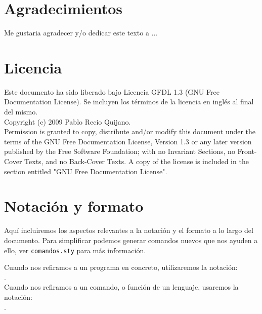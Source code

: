 

\section*{Agradecimientos}

Me gustaria agradecer y/o dedicar este texto a ...

\cleardoublepage

\section*{Licencia} %

Este documento ha sido liberado bajo Licencia GFDL 1.3 (GNU Free
Documentation License). Se incluyen los términos de la licencia en
inglés al final del mismo.\\

Copyright (c) 2009 Pablo Recio Quijano.\\

Permission is granted to copy, distribute and/or modify this document under the
terms of the GNU Free Documentation License, Version 1.3 or any later version
published by the Free Software Foundation; with no Invariant Sections, no
Front-Cover Texts, and no Back-Cover Texts. A copy of the license is included in
the section entitled "GNU Free Documentation License".\\

\cleardoublepage

\section*{Notación y formato}

Aquí incluiremos los aspectos relevantes a la notación y el formato a
lo largo del documento. Para simplificar podemos generar comandos
nuevos que nos ayuden a ello, ver \texttt{comandos.sty} para más
información. 

Cuando nos refiramos a un programa en concreto, utilizaremos la
notación: \\ .\\

Cuando nos refiramos a un comando, o función de un lenguaje, usaremos
la notación: \\ .\\